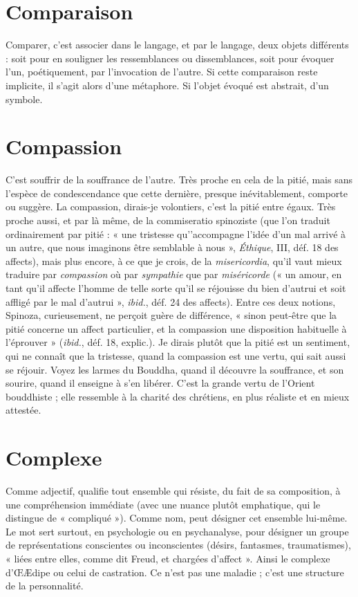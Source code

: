 \section{Comparaison}
Comparer, c’est associer dans le langage, et par le langage,
deux objets différents : soit pour en souligner les ressemblances
ou dissemblances, soit pour évoquer l’un, poétiquement, par l’invocation
de l’autre. Si cette comparaison reste implicite, il s’agit alors d’une métaphore.
Si l’objet évoqué est abstrait, d’un symbole.

\section{Compassion}
C'est souffrir de la souffrance de l’autre. Très proche en
cela de la pitié, mais sans l’espèce de condescendance que
cette dernière, presque inévitablement, comporte ou suggère. La compassion,
dirais-je volontiers, c’est la pitié entre égaux. Très proche aussi, et par là même,
de la commiseratio spinoziste (que l’on traduit ordinairement par pitié : « une
tristesse qu'’accompagne l’idée d’un mal arrivé à un autre, que nous imaginons
être semblable à nous », {\it Éthique}, III, déf. 18 des affects), mais plus encore, à ce
que je crois, de la {\it misericordia}, qu’il vaut mieux traduire par {\it compassion} où par
{\it sympathie} que par {\it miséricorde} (« un amour, en tant qu’il affecte l’homme de
telle sorte qu’il se réjouisse du bien d’autrui et soit affligé par le mal d’autrui »,
{\it ibid.}, déf. 24 des affects). Entre ces deux notions, Spinoza, curieusement, ne
perçoit guère de différence, « sinon peut-être que la pitié concerne un affect
particulier, et la compassion une disposition habituelle à l’éprouver » ({\it ibid.},
déf. 18, explic.). Je dirais plutôt que la pitié est un sentiment, qui ne connaît
que la tristesse, quand la compassion est une vertu, qui sait aussi se réjouir.
Voyez les larmes du Bouddha, quand il découvre la souffrance, et son sourire,
quand il enseigne à s’en libérer. C’est la grande vertu de l'Orient bouddhiste ;
elle ressemble à la charité des chrétiens, en plus réaliste et en mieux attestée.

\section{Complexe}
Comme adjectif, qualifie tout ensemble qui résiste, du fait de
sa composition, à une compréhension immédiate (avec une
nuance plutôt emphatique, qui le distingue de « compliqué »). Comme nom,
peut désigner cet ensemble lui-même. Le mot sert surtout, en psychologie ou
en psychanalyse, pour désigner un groupe de représentations conscientes ou
inconscientes (désirs, fantasmes, traumatismes), « liées entre elles, comme dit
Freud, et chargées d’affect ». Ainsi le complexe d'ŒÆdipe ou celui de castration.
Ce n’est pas une maladie ; c’est une structure de la personnalité.

